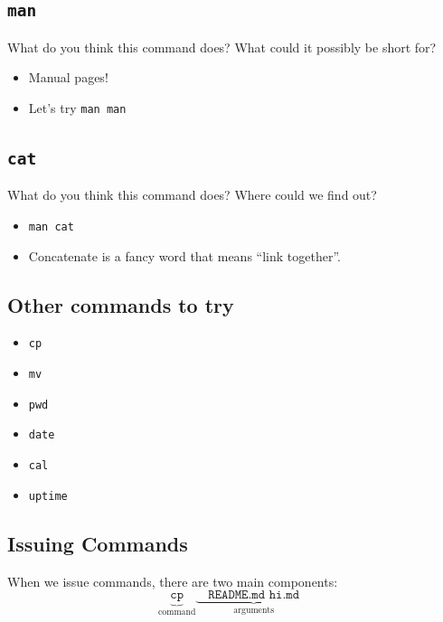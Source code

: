 \documentclass[aspectratio=1610]{beamer}                  %
\newcommand{\srule}{
	\rule{\textwidth}{1pt}\\
}
\newlength{\subsecwidth}
\newenvironment{slide}{
	\begin{frame}                                    %
		\settowidth{\subsecwidth}{\insertsubsection} %
		\ifthenelse{\dimtest{\subsecwidth}{<}{1pt}}{ %
			\frametitle{\huge \insertsection\\             %
				\vspace{-1ex}                            %
			}
		}{                                           %
			\frametitle{\huge \insertsection\ -- \insertsubsection\\ %
				\vspace{-1ex}                            %
			}
		}
		\Large                                       %
	}{
	\end{frame}
}
\begin{document}
\subsection{\texttt{man}}
\begin{slide}
    What do you think this command does? What could it possibly be short for?
    \pause
    \begin{itemize}
        \item Manual pages!
        \item Let's try \texttt{man man}
     \end{itemize}
\end{slide}

\subsection{\texttt{cat}}
\begin{slide}
    What do you think this command does? Where could we find out?
    \pause
    \begin{itemize}
        \item \texttt{man cat}
        \item Concatenate is a fancy word that means ``link together''.
    \end{itemize}
\end{slide}

\subsection{Other commands to try}
\begin{slide}
        \begin{itemize}
            \item \texttt{cp}
            \item \texttt{mv}
            \item \texttt{pwd}
            \item \texttt{date}
            \item \texttt{cal}
            \item \texttt{uptime}
        \end{itemize}
\end{slide}

\subsection{Issuing Commands}
\begin{slide}
    When we issue commands, there are two main components:
	\huge
	\[
        \hspace {0em} \underbrace{\texttt{cp}}_{\text{command}}
        \underbrace{
        \hspace {1em}
            \texttt{README.md hi.md}
        \hspace {1em}
        }_{\text{arguments}}
	\]
\end{slide}
\end{document}
